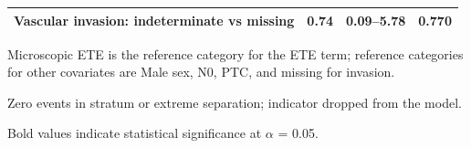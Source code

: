 \begin{table}[htbp]
\begin{threeparttable}
\begin{tabular}{@{}lccc@{}}
Vascular invasion: indeterminate vs missing & 0.74 & 0.09--5.78 & 0.770 \\
\bottomrule
\end{tabular}
\begin{tablenotes}
\small
\item Microscopic ETE is the reference category for the ETE term; reference categories for other covariates are Male sex, N0, PTC, and missing for invasion.
\item[\textsuperscript{a}] Zero events in stratum or extreme separation; indicator dropped from the model.
\item Bold values indicate statistical significance at $\alpha$ = 0.05.
\end{tablenotes}
\end{threeparttable}
\end{table}


